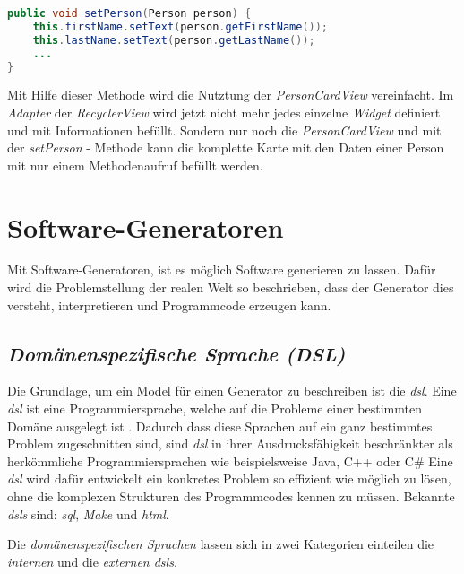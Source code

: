 \begin{lstlisting}[label=lst:setPerson,
language=java,
firstnumber=1,
caption=\textit{setPerson} - Methode aus der \textit{PersonCardView}.]				  
public void setPerson(Person person) {
	this.firstName.setText(person.getFirstName());
	this.lastName.setText(person.getLastName());	
	...
}
\end{lstlisting}

Mit Hilfe dieser Methode wird die Nutztung der \textit{PersonCardView} vereinfacht. Im \textit{Adapter} der \textit{RecyclerView} wird jetzt nicht mehr jedes einzelne \textit{Widget} definiert und mit Informationen befüllt. Sondern nur noch die \textit{PersonCardView} und mit der \textit{setPerson} - Methode kann die komplette Karte mit den Daten einer Person mit nur einem Methodenaufruf befüllt werden.

\section{Software-Generatoren}\label{sec:generators}

Mit Software-Generatoren, ist es möglich Software generieren zu lassen. Dafür wird die Problemstellung der realen Welt so beschrieben, dass der Generator dies versteht, interpretieren und Programmcode erzeugen kann.

\subsection{\textit{Domänenspezifische Sprache (DSL)}}\label{sec:dsl}
Die Grundlage, um ein Model für einen Generator zu beschreiben ist die \textit{\acl{dsl}}.
Eine \textit{\acs{dsl}} ist eine Programmiersprache, welche auf die Probleme einer bestimmten Domäne ausgelegt ist \cite{dslHudak}. Dadurch dass diese Sprachen auf ein ganz bestimmtes Problem zugeschnitten sind, sind \textit{\acl{dsl}} in ihrer Ausdrucksfähigkeit beschränkter als herkömmliche Programmiersprachen wie beispielsweise Java, C++ oder C\# Eine \textit{\acl{dsl}} wird dafür entwickelt ein konkretes Problem so effizient wie möglich zu lösen, ohne die komplexen Strukturen des Programmcodes kennen zu müssen.
Bekannte \textit{\aclp{dsl}} sind: \textit{\ac{sql}}, \textit{Make} und \textit{\acf{html}}.

Die \textit{domänenspezifischen Sprachen} lassen sich in zwei Kategorien einteilen die \textit{internen} und die \textit{externen \acsp{dsl}}.


